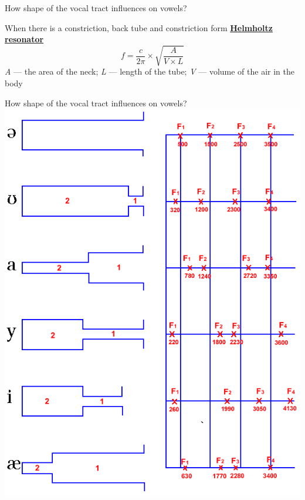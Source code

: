 \begin{frame}{How shape of the vocal tract influences on vowels?}
\Large
\vfill
\begin{center}
\begin{vowel}
\end{vowel}
\end{center}
\vfill
\normalsize
When there is a constriction, back tube and constriction form \href{https://github.com/agricolamz/2018_m_Instrumental_Phonetics/raw/master/docs/materials/Helmholtz-resonance.mp4}{\textbf{Helmholtz resonator}}
$$f = \frac{c}{2\pi} \times \sqrt{\frac{A}{V\times L}}$$
\textit{A} --- the area of the neck; \textit{L} --- length of the tube; \textit{V} --- volume of the air in the body
\end{frame}

\begin{frame}{How shape of the vocal tract influences on vowels?}
\includegraphics[width=0.6\linewidth]{15-tubes.png}
\end{frame}

